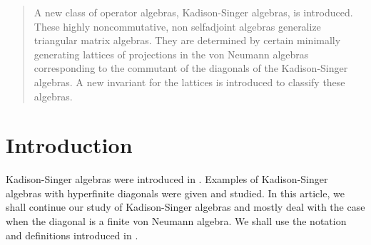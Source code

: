 \documentclass{pnastwo}
\begin{document}
\begin{article}

\begin{abstract}
A new class of operator algebras, Kadison-Singer algebras, is
introduced. These highly noncommutative, non selfadjoint algebras
generalize triangular matrix algebras. They are determined by
certain minimally generating lattices of projections in the von
Neumann algebras corresponding to the commutant of the diagonals of
the Kadison-Singer algebras. A new invariant for the lattices is
introduced to classify these algebras.
\end{abstract}






\section{Introduction}

Kadison-Singer algebras were introduced in \cite{GY}.
Examples of Kadison-Singer algebras with hyperfinite diagonals
were given and studied. In this article, we shall continue our
study of Kadison-Singer algebras and mostly deal with the case
when the diagonal is a finite von Neumann algebra. We shall use
the notation and definitions introduced in \cite{GY}.


\end{article}
\end{document}
